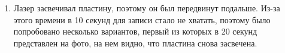 \documentclass[aps,twocolumn,secnumarabic,balancelastpage,amsmath,amssymb,nofootinbib, floatfix]{revtex4-1}
\begin{document}
\begin{enumerate}
\item Лазер засвечивал пластину, поэтому он был передвинут подальше. Из-за этого времени в 10 секунд для записи стало не хватать, поэтому было попробовано несколько вариантов, первый из которых в 20 секунд представлен на фото, на нем видно, что пластина снова засвечена.
\begin{figure}[H]
	\centering
	\quad
\end{figure}
\end{enumerate}
\end{document}
